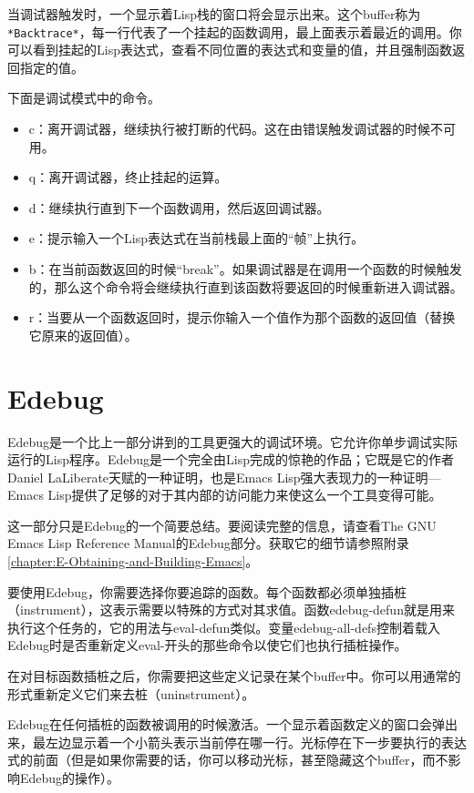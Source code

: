 当调试器触发时，一个显示着Lisp栈的窗口将会显示出来。这个buffer称为\texttt{*Backtrace*}，每一行代表了一个挂起的函数调用，最上面表示着最近的调用。你可以看到挂起的Lisp表达式，查看不同位置的表达式和变量的值，并且强制函数返回指定的值。

下面是调试模式中的命令。

\begin{itemize}
  \item c：离开调试器，继续执行被打断的代码。这在由错误触发调试器的时候不可用。
  \item q：离开调试器，终止挂起的运算。
  \item d：继续执行直到下一个函数调用，然后返回调试器。
  \item e：提示输入一个Lisp表达式在当前栈最上面的“帧”上执行。
  \item b：在当前函数返回的时候“break”。如果调试器是在调用一个函数的时候触发的，那么这个命令将会继续执行直到该函数将要返回的时候重新进入调试器。
  \item r：当要从一个函数返回时，提示你输入一个值作为那个函数的返回值（替换它原来的返回值）。
\end{itemize}

\section{Edebug}
\label{section:C-Edebug}

Edebug是一个比上一部分讲到的工具更强大的调试环境。它允许你单步调试实际运行的Lisp程序。Edebug是一个完全由Lisp完成的惊艳的作品；它既是它的作者Daniel LaLiberate天赋的一种证明，也是Emacs Lisp强大表现力的一种证明---Emacs Lisp提供了足够的对于其内部的访问能力来使这么一个工具变得可能。

这一部分只是Edebug的一个简要总结。要阅读完整的信息，请查看The GNU Emacs Lisp Reference Manual的Edebug部分。获取它的细节请参照附录\ref{chapter:E-Obtaining-and-Building-Emacs}。

要使用Edebug，你需要选择你要追踪的函数。每个函数都必须单独插桩（instrument），这表示需要以特殊的方式对其求值。函数edebug-defun就是用来执行这个任务的，它的用法与eval-defun类似。变量edebug-all-defs控制着载入Edebug时是否重新定义eval-开头的那些命令以使它们也执行插桩操作。

在对目标函数插桩之后，你需要把这些定义记录在某个buffer中。你可以用通常的形式重新定义它们来去桩（uninstrument）。

Edebug在任何插桩的函数被调用的时候激活。一个显示着函数定义的窗口会弹出来，最左边显示着一个小箭头表示当前停在哪一行。光标停在下一步要执行的表达式的前面（但是如果你需要的话，你可以移动光标，甚至隐藏这个buffer，而不影响Edebug的操作）。

